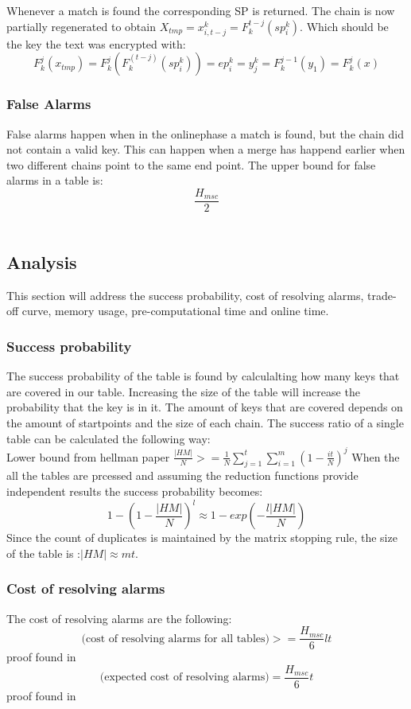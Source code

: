 Whenever a match is found the corresponding SP is returned. The chain is now partially regenerated to obtain $X_{tmp}=x^k_{i,t-j}=F^{t-j}_k(sp^k_i)$. Which should be the key the text was encrypted with:
\begin{equation}
    F^j_k(x_{tmp})=F^j_k(F^(t-j)_k(sp^k_i))=ep^k_i=y^k_j=F^{j-1}_k(y_1)=F^j_k(x)
\end{equation}
\subsubsection{False Alarms}
False alarms happen when in the onlinephase a match is found, but the chain did not contain a valid key. This can happen when a merge has happend earlier when two different chains point to the same end point. The upper bound for false alarms in a table is:
\begin{equation}
\frac{H_{msc}}{2}
\end{equation}
\\

\subsection{Analysis}
This section will address the success probability, cost of resolving alarms, trade-off curve, memory usage, pre-computational time and online time.

\subsubsection*{Success probability}
The success probability of the table is found by calculalting how many keys that are covered in our table. Increasing the size of the table will increase the probability that the key is in it. The amount of keys that are covered depends on the amount of startpoints and the size of each chain. The success ratio of a single table can be calculated the following way:\\
Lower bound from hellman paper\cite{176}
$\frac{|HM|}{N}>=\frac{1}{N}\sum^{t}_{j=1}\sum^{m}_{i=1}(1-\frac{it}{N})^{j} $
When the all the tables are prcessed and assuming the reduction functions provide independent results the success probability becomes:
\[1-(1-\frac{|HM|}{N})^l\approx 1- exp(-\frac{l|HM|}{N})\]
Since the count of duplicates is maintained by the matrix stopping rule, the size of the table is :$|HM|\approx mt$.
\subsubsection{Cost of resolving alarms}
The cost of resolving alarms are the following:
\begin{equation}
\text{(cost of resolving alarms for all tables)}>=\frac{H_{msc}}{6}lt
\end{equation}
proof found in \cite{176}
\begin{equation}
\text{(expected cost of resolving alarms)}=\frac{H_{msc}}{6}t
\end{equation}
proof found in \cite{176}
